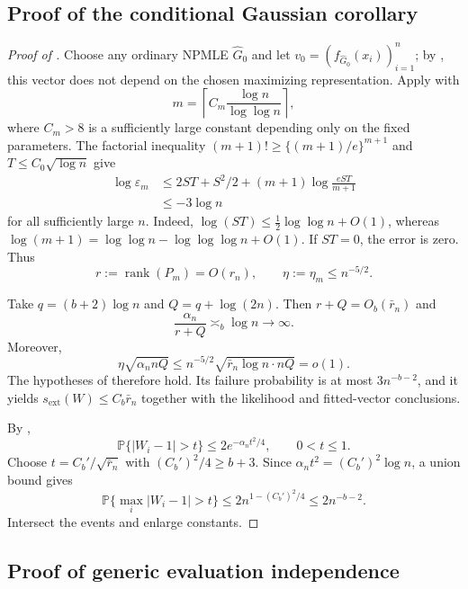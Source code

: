 \documentclass[11pt]{article}
\theoremstyle{definition}
\theoremstyle{remark}
\DeclareMathOperator{\rank}{rank}
\newcommand{\PP}{\mathbb P}
\newcommand{\abs}[1]{\lvert #1\rvert}
\newcommand{\Ghat}{\widehat G}
\newcommand{\eps}{\varepsilon}
\newcommand{\sext}{s_{\mathrm{ext}}}
\begin{document}
\subsection{Proof of the conditional Gaussian corollary}

\begin{proof}[Proof of ]
Choose any ordinary NPMLE $\Ghat_0$
and let $v_0=(f_{\Ghat_0}(x_i))_{i=1}^n$; by , this
vector does not depend on the chosen maximizing representation.  Apply
 with
\[
 m=\left\lceil C_m\frac{\log n}{\log\log n}\right\rceil,
\]
where $C_m>8$ is a sufficiently large constant depending only on the fixed
parameters.  The factorial inequality $(m+1)!\ge\{(m+1)/e\}^{m+1}$ and
$T\le C_0\sqrt{\log n}$ give
\begin{align*}
 \log\eps_m
 &\le 2ST+S^2/2+(m+1)\log\frac{eST}{m+1}\\
 &\le-3\log n
\end{align*}
for all sufficiently large $n$.  Indeed,
$\log(ST)\le\tfrac12\log\log n+O(1)$, whereas
$\log(m+1)=\log\log n-\log\log\log n+O(1)$.  If $ST=0$, the error is zero.
Thus
\[
 r:=\rank(P_m)=O(r_n),\qquad
 \eta:=\eta_m\le n^{-5/2}.
\]

Take
$q=(b+2)\log n$ and $Q=q+\log(2n)$.  Then $r+Q=O_b(\bar r_n)$ and
\[
 \frac{\alpha_n}{r+Q}\asymp_b\log n\to\infty.
\]
Moreover,
\[
 \eta\sqrt{\alpha_n nQ}
 \le n^{-5/2}\sqrt{\bar r_n\log n\cdot nQ}=o(1).
\]
The hypotheses of  therefore hold.  Its failure
probability is at most $3n^{-b-2}$, and it yields $\sext(W)\le C_b\bar r_n$
together with the likelihood and fitted-vector conclusions.

By ,
\begin{equation}\label{eq:gamma-coordinate}
 \PP\{\abs{W_i-1}>t\}\le2e^{-\alpha_nt^2/4},
 \qquad 0<t\le1.
\end{equation}
Choose $t=C_b'/\sqrt{\bar r_n}$ with $(C_b')^2/4\ge b+3$.  Since
$\alpha_nt^2=(C_b')^2\log n$, a union bound gives
\[
 \PP\{\max_i\abs{W_i-1}>t\}
 \le2n^{1-(C_b')^2/4}\le2n^{-b-2}.
\]
Intersect the events and enlarge constants.
\end{proof}

\subsection{Proof of generic evaluation independence}
\label{app:generic}
\end{document}
